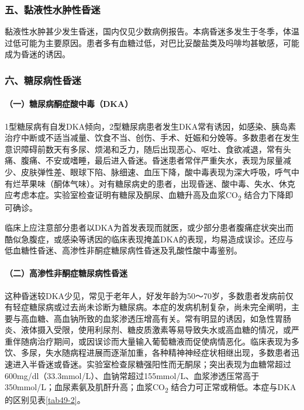 \subsubsection{五、黏液性水肿性昏迷}

黏液性水肿甚少发生昏迷，国内仅见少数病例报告。本病昏迷多发生于冬季，体温过低可能为主要原因。患者多有血糖过低，对巴比妥酸盐类及吗啡均甚敏感，可能成为昏迷的诱因。

\subsubsection{六、糖尿病性昏迷}

\paragraph{（一）糖尿病酮症酸中毒（DKA）}

1型糖尿病有自发DKA倾向，2型糖尿病患者发生DKA常有诱因，如感染、胰岛素治疗中断或不适当减量、饮食不当、创伤、手术、妊娠和分娩等。多数患者在发生意识障碍前数天有多尿、烦渴和乏力，随后出现恶心、呕吐、食欲减退，常有头痛、腹痛、不安或嗜睡，最后进入昏迷。昏迷患者常伴严重失水，表现为尿量减少、皮肤弹性差、眼球下陷、脉细速、血压下降，酸中毒表现为深大呼吸，呼气中有烂苹果味（酮体气味）。对有糖尿病史的患者，出现昏迷、酸中毒、失水、休克应考虑本症。实验室检查证明有糖尿及酮尿、血糖升高及血浆CO\textsubscript{2}
结合力下降即可确诊。

临床上应注意部分患者以DKA为首发表现而就医，或少部分患者腹痛症状突出而酷似急腹症，或感染等诱因的临床表现掩盖DKA的表现，均易造成误诊。还应与低血糖性昏迷、高渗性非酮症糖尿病性昏迷及乳酸性酸中毒鉴别。

\paragraph{（二）高渗性非酮症糖尿病性昏迷}

这种昏迷较DKA少见，常见于老年人，好发年龄为50～70岁，多数患者发病前仅有轻症糖尿病或过去尚未诊断为糖尿病。本症的发病机制复杂，尚未完全阐明，主要与高血糖、高血钠所致的血浆渗透压增高有关。常有明显的诱因，如急性胃肠炎、液体摄入受限，使用利尿剂、糖皮质激素等易导致失水或高血糖的情况，或严重伴随病治疗期间，或因误诊而大量输入葡萄糖液而促使病情恶化。临床表现为多饮、多尿，失水随病程进展而逐渐加重，各种精神神经症状相继出现，多数患者迅速进入半昏迷或昏迷。实验室检查尿糖强阳性而无酮尿；突出表现为血糖常超过600mg/dl（33.3mmol/L）、血钠常超过155mmol/L、血浆渗透压常高于350mmol/L；血尿素氨及肌酐升高；血浆CO\textsubscript{2}
结合力可正常或稍低。本症与DKA的区别见表\ref{tab49-2}。

